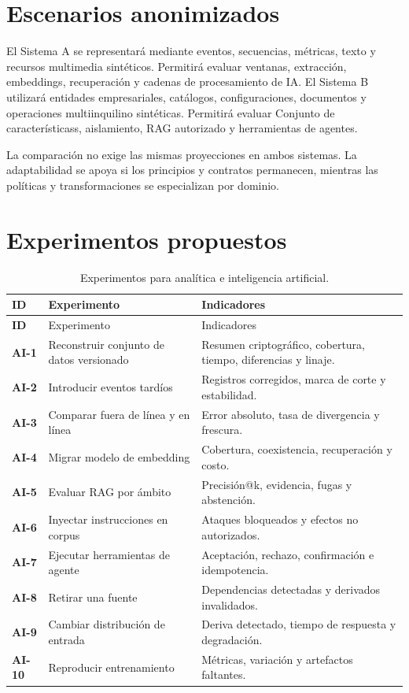 \section{Escenarios anonimizados}

El Sistema A se representará mediante eventos, secuencias, métricas, texto y recursos
multimedia sintéticos. Permitirá evaluar ventanas, extracción, embeddings, recuperación
y cadenas de procesamiento de IA. El Sistema B utilizará entidades empresariales, catálogos,
configuraciones, documentos y operaciones multiinquilino sintéticas. Permitirá evaluar
Conjunto de característicass, aislamiento, RAG autorizado y herramientas de agentes.

La comparación no exige las mismas proyecciones en ambos sistemas. La adaptabilidad se
apoya si los principios y contratos permanecen, mientras las políticas y
transformaciones se especializan por dominio.

\section{Experimentos propuestos}

\begin{longtable}{>{\bfseries}p{1.4cm}p{4.7cm}p{8cm}}
\caption{Experimentos para analítica e inteligencia artificial.}\label{tab:experimentos-ia}\\
\toprule
ID & Experimento & Indicadores \\
\midrule
\endfirsthead
\toprule
ID & Experimento & Indicadores \\
\midrule
\endhead
AI-1 & Reconstruir conjunto de datos versionado & Resumen criptográfico, cobertura, tiempo, diferencias y linaje.\\
AI-2 & Introducir eventos tardíos & Registros corregidos, marca de corte y estabilidad.\\
AI-3 & Comparar fuera de línea y en línea & Error absoluto, tasa de divergencia y frescura.\\
AI-4 & Migrar modelo de embedding & Cobertura, coexistencia, recuperación y costo.\\
AI-5 & Evaluar RAG por ámbito & Precisión@k, evidencia, fugas y abstención.\\
AI-6 & Inyectar instrucciones en corpus & Ataques bloqueados y efectos no autorizados.\\
AI-7 & Ejecutar herramientas de agente & Aceptación, rechazo, confirmación e idempotencia.\\
AI-8 & Retirar una fuente & Dependencias detectadas y derivados invalidados.\\
AI-9 & Cambiar distribución de entrada & Deriva detectado, tiempo de respuesta y degradación.\\
AI-10 & Reproducir entrenamiento & Métricas, variación y artefactos faltantes.\\
\bottomrule
\end{longtable}

